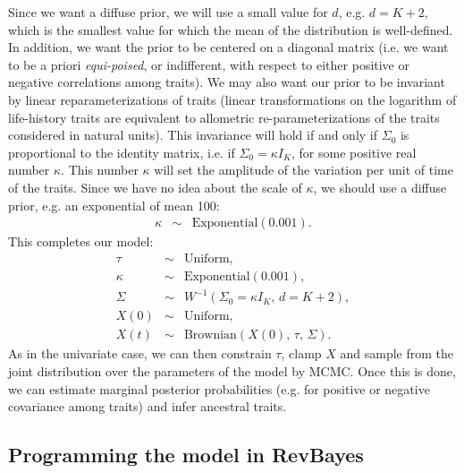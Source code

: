 \documentclass[usletter]{article}
\begin{document}
Since we want a diffuse prior, we will use a small value for $d$, e.g. $d=K+2$, which is the smallest value for which the mean of the distribution is well-defined.
In addition, we want the prior to be centered on a diagonal matrix (i.e. we want to be a priori \emph{equi-poised}, or indifferent, with respect to either positive or negative correlations among traits). We may also want our prior to be invariant by linear reparameterizations of traits (linear transformations on the logarithm of life-history traits are equivalent to allometric re-parameterizations of the traits considered in natural units). This invariance will hold if and only if $\Sigma_0$ is proportional to the identity matrix, i.e. if $\Sigma_0 = \kappa I_K$, for some positive real number $\kappa$. This number $\kappa$ will set the amplitude of the variation per unit of time of the traits. Since we have no idea about the scale of $\kappa$, we should use a diffuse prior, e.g. an exponential of mean 100:
\begin{eqnarray*}
\kappa &\sim& \text{Exponential}(0.001).
\end{eqnarray*}
This completes our model:
\begin{eqnarray*}
\tau &\sim& \text{Uniform},
\\
\kappa &\sim& \text{Exponential}(0.001),
\\
\Sigma &\sim& W^{-1}(\Sigma_0 = \kappa I_K , \, d = K+2),
\\
X(0) &\sim& \text{Uniform},
\\
X(t) &\sim& \text{Brownian}(X(0), \, \tau, \, \Sigma).
\end{eqnarray*}
As in the univariate case, we can then constrain $\tau$, clamp $X$ and sample from the joint distribution over the parameters of the model by MCMC.
Once this is done, we can estimate marginal posterior probabilities (e.g. for positive or negative covariance among traits) and infer ancestral traits.

\subsection*{Programming the model in RevBayes}
\end{document}
